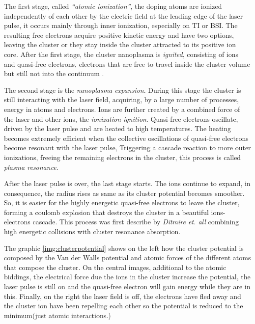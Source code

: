 The first stage, called \textit{“atomic ionization”}, the doping atoms are ionized independently of each other by the electric field at the leading edge of the laser pulse, it occurs mainly through inner ionization, especially on TI or BSI. The resulting free electrons acquire positive kinetic energy and have two options, leaving  the cluster or they stay inside the cluster attracted to its positive ion core. After the first stage, the cluster nanoplasma is \textit{ignited}, consisting of ions and quasi-free electrons, electrons that are free to travel inside the cluster volume but still not into the continuum \cite{last_quasiresonance_1999}. 


The second stage is the  \textit{nanoplasma expansion}. During this stage the cluster is still interacting with the laser field, acquiring, by a large number of processes, energy in atoms and electrons. Ions are further created by a combined force of the laser and other ions, the \textit{ionization ignition}\cite{gruner_femtosekundenspektroskopie_2013}. Quasi-free electrons oscillate, driven by the laser pulse and are heated to high temperatures. The heating becomes extremely efficient when the collective oscillations of quasi-free electrons become resonant with the laser pulse, Triggering a cascade reaction to more outer ionizations,  freeing the remaining electrons in the cluster, this process is called \textit{plasma resonance}\cite{saalmann_mechanisms_2006}.


After the laser pulse is over, the last stage starts. The ions continue to expand, in consequence, the radius rises as same as its cluster potential becomes smoother. So, it is easier for the highly energetic quasi-free electrons to leave the cluster, forming a coulomb explosion that destroys the cluster in a beautiful ions-electrons cascade. This process was first describe by \textit{Ditmire et. all} \cite{ditmire_interaction_1996} combining high energetic collisions with cluster resonance absorption.

The graphic \ref{img:clusterpotential} shows on the left how the cluster potential is composed by the Van der Walls potential and atomic forces of the different atoms that compose the cluster. On the central images, additional to the atomic biddings, the electrical force due the ions in the cluster increase the potential, the laser pulse is still on and the quasi-free electron will gain energy while they are in this. Finally, on the right the laser field is off, the electrons have fled away and the cluster ion have been repelling each other so the potential is reduced to the minimum(just atomic interactions.)

